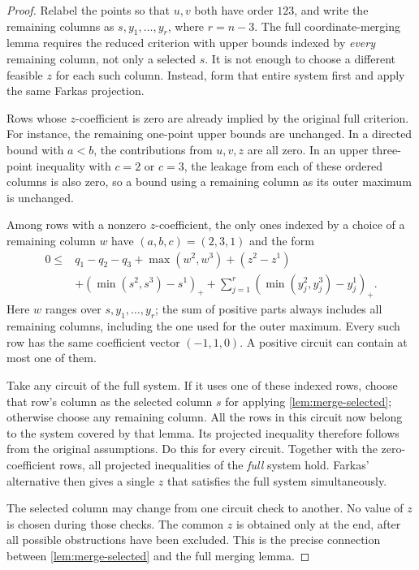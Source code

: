 \documentclass[a4paper,11pt]{amsart}
\numberwithin{equation}{section}
\theoremstyle{definition}
\theoremstyle{remark}
\begin{document}
\begin{proof}
Relabel the points so that $u,v$ both have order $123$, and write the
remaining columns as $s,y_1,\ldots,y_r$, where $r=n-3$.
The full coordinate-merging lemma requires the reduced criterion with upper
bounds indexed by \emph{every} remaining column, not only a selected $s$.
It is not enough to choose a different feasible $z$ for each such column.
Instead, form that entire system first and apply the same Farkas projection.

Rows whose $z$-coefficient is zero are already implied by the original full
criterion. For instance, the remaining one-point upper bounds are unchanged.
In a directed bound with $a<b$, the contributions from $u,v,z$ are all zero.
In an upper three-point inequality with $c=2$ or $c=3$, the leakage from each
of these ordered columns is also zero, so a bound using a remaining column
as its outer maximum is unchanged.

Among rows with a nonzero $z$-coefficient, the only ones indexed by a choice
of a remaining column $w$ have $(a,b,c)=(2,3,1)$ and the form
\begin{align*}
0\le{}&q_1-q_2-q_3+\max(w^2,w^3)+(z^2-z^1)\\
 &+(\min(s^2,s^3)-s^1)_+
 +\sum_{j=1}^r(\min(y_j^2,y_j^3)-y_j^1)_+.
\end{align*}
Here $w$ ranges over $s,y_1,\ldots,y_r$; the sum of positive parts always
includes all remaining columns, including the one used for the outer
maximum. Every such row has the same coefficient vector $(-1,1,0)$.
A positive circuit can contain at most one of them.

Take any circuit of the full system. If it uses one of these indexed rows,
choose that row's column as the selected column $s$ for applying \cref{lem:merge-selected};
otherwise choose any remaining column. All the rows in this circuit now
belong to the system covered by that lemma. Its projected inequality
therefore follows from the original assumptions. Do this for every circuit.
Together with the zero-coefficient rows, all projected inequalities of the
\emph{full} system hold. Farkas' alternative then gives a single $z$ that
satisfies the full system simultaneously.

The selected column may change from one circuit check to another.
No value of $z$ is chosen during those checks. The common $z$ is obtained
only at the end, after all possible obstructions have been excluded. This
is the precise connection between \cref{lem:merge-selected} and the full merging lemma.

\end{proof}
\end{document}

